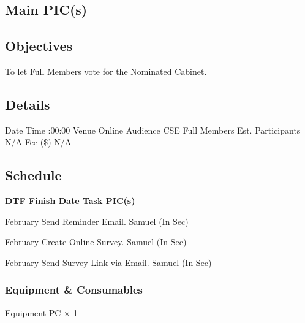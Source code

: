 \startsection[title={CSESS Polling}][
date={\date[d=22, m=2, y=2024][event]},
pic={Terry (P)}]

\subsection{Main PIC(s)}

\subsection{Objectives}
\startitemize
\item To let Full Members vote for the Nominated Cabinet.
\stopitemize

\subsection{Details}
\starttabulate[|rB|l|]
\NC Date
\NC {} \NR
\NC Time
:00:00 \NR
\NC Venue
\NC Online \NR
\NC Audience
\NC CSE Full Members \NR
\NC Est. Participants
\NC N/A \NR
\NC Fee (\$)
\NC N/A \NR
\stoptabulate

\subsection{Schedule}

\setupTABLE[c][1][width=0.75in]
\setupTABLE[c][2][width=1in]
\setupTABLE[c][3][width=3in]
\setupTABLE[c][4][width=1.25in]
\bTABLE
\bTABLEhead

\bTR\bTH    \bf{DTF}
\eTH\bTH    \bf{Finish Date}
\eTH\bTH    \bf{Task}
\eTH\bTH    \bf{PIC(s)}
\eTH\eTR

\eTABLEhead
\bTABLEbody

\bTR{}
\eTD{} February
\eTD\bTD Send Reminder Email.
\eTD\bTD Samuel (In Sec)
\eTD\eTR

\bTR{}
\eTD{} February
\eTD\bTD Create Online Survey.
\eTD\bTD Samuel (In Sec)
\eTD\eTR

\bTR{}
\eTD{} February
\eTD\bTD Send Survey Link via Email.
\eTD\bTD Samuel (In Sec)
\eTD\eTR

\eTABLEbody
\eTABLE

\subsubsection{Equipment \& Consumables}
\starttabulate[|l|l|]
\NC{}Equipment\NC\NR
\HL
\NC PC \NC $\times$ 1 \NR
\HL
\stoptabulate

\stopsection
\pagebreak
